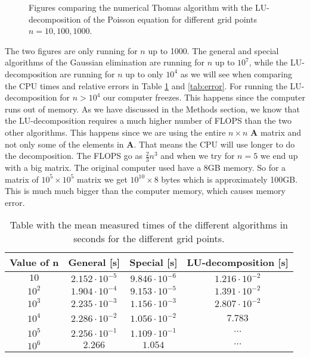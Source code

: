 \documentclass[12pt,a4paper,english]{article}
\begin{document}
\begin{figure}[htbp]
	\hspace*{-2.5cm}
	\subfloat[Comparison for $n=10$]{\texttt{[image: Gaussian\_vs\_LU\_n=10.png]}}
	\subfloat[Comparison for $n=100$]{\texttt{[image: Gaussian\_vs\_LU\_n=100.png]}}
	\subfloat[Comparison for $n=1000$]{\texttt{[image: Gaussian\_vs\_LU\_n=1000.png]}}
	\caption{Figures comparing the numerical Thomas algorithm with the LU-decomposition of the Poisson equation for different grid points $n=10, 100, 1000$.\label{fig:gauss_LU}}
\end{figure}

The two figures are only running for $n$ up to 1000. The general and special algorithms of the Gaussian elimination are running for $n$ up to $10^7$, while the LU-decomposition are running for $n$ up to only $10^4$ as we will see when comparing the CPU times and relative errors in Table \ref{tab:times} and \ref{tab:error}. For running the LU-decomposition for $n>10^4$ our computer freezes. This happens since the computer runs out of memory. As we have discussed in the Methods section, we know that the LU-decomposition requires a much higher number of FLOPS than the two other algorithms. This happens since we are using the entire $n\times n$ \textbf{A} matrix and not only some of the elements in \textbf{A}. That means the CPU will use longer to do the decomposition. The FLOPS go as $\frac{2}{3}n^3$ and when we try for $n=5$ we end up with a big matrix. The original computer used have a 8GB memory. So for a matrix of $10^5\times10^5$ matrix we get $10^{10}\times 8$ bytes which is approximately 100GB. This is much much bigger than the computer memory, which causes memory error.

\begin{table}[h!]
\begin{tabular}{ |c|c|c|c| }
	\hline \rule{0pt}{13pt}
	Value of n&General [s]&Special [s]&LU-decomposition [s]\\
	\hline \rule{0pt}{13pt}
	$10$&$2.152\cdot10^{-5}$& $9.846\cdot10^{-6}$ & $1.216\cdot10^{-2}$\\
	\hline \rule{0pt}{13pt}
	$10^2$ & $1.904\cdot10^{-4}$ & $9.153\cdot10^{-5}$ & $1.391\cdot10^{-2}$ \\
	\hline \rule{0pt}{13pt}
	$10^3$ & $2.235\cdot10^{-3}$ & $1.156\cdot10^{-3}$ & $2.807\cdot10^{-2}$\\
	\hline \rule{0pt}{13pt}
	$10^4$ & $2.286\cdot10^{-2}$ & $1.056\cdot10^{-2}$ & 7.783\\
	\hline \rule{0pt}{13pt}
	$10^5$ & $2.256\cdot10^{-1}$ & $1.109\cdot10^{-1}$ & $\cdots$\\
	\hline \rule{0pt}{13pt}
	$10^6$ & $2.266$ & $1.054$ & $\cdots$\\
	\hline
\end{tabular}	
\caption{Table with the mean measured times of the different algorithms in seconds for the different grid points.}
\label{tab:times}
\end{table}
\end{document}
